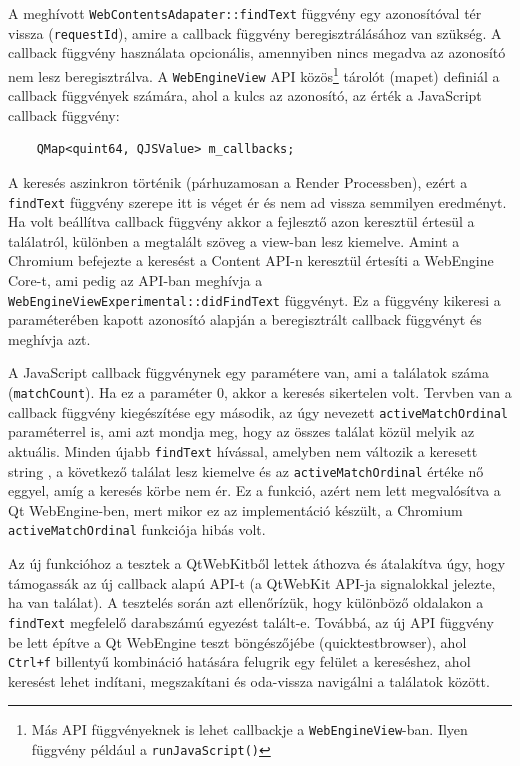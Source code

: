 \documentclass[12pt]{report}
\begin{document}
A meghívott \texttt{WebContentsAdapater::findText} függvény egy azonosítóval tér vissza
(\texttt{requestId}), amire a callback függvény beregisztrálásához van szükség.
A callback függvény használata opcionális, amennyiben nincs megadva az azonosító nem lesz
beregisztrálva. A \texttt{WebEngineView} API közös\footnote{Más API függvényeknek is lehet
callbackje a \texttt{WebEngineView}-ban. Ilyen függvény például a \texttt{runJavaScript()}}
tárolót (mapet) definiál a callback függvények számára, ahol a kulcs az azonosító, az érték
a JavaScript callback függvény:
\begin{verbatim}
    QMap<quint64, QJSValue> m_callbacks;
\end{verbatim}
A keresés aszinkron történik (párhuzamosan a Render Processben), ezért a \texttt{findText}
függvény szerepe itt is véget ér és nem ad vissza semmilyen eredményt. Ha volt
beállítva callback függvény akkor a fejlesztő azon keresztül értesül a találatról, különben
a megtalált szöveg a view-ban lesz kiemelve. Amint a Chromium befejezte a keresést a
Content API-n keresztül értesíti a WebEngine Core-t, ami pedig az API-ban meghívja a
\texttt{WebEngineViewExperimental::didFindText} függvényt. Ez a függvény kikeresi a
paraméterében kapott azonosító alapján a beregisztrált callback függvényt és meghívja azt.

A JavaScript callback függvénynek egy paramétere van, ami a találatok
száma (\texttt{matchCount}). Ha ez a paraméter 0, akkor a keresés sikertelen volt.
Tervben van a callback függvény kiegészítése egy második, az úgy nevezett
\texttt{activeMatchOrdinal} paraméterrel is, ami azt mondja meg, hogy az összes találat
közül melyik az aktuális. Minden újabb \texttt{findText} hívással, amelyben nem
változik a keresett string , a következő találat lesz kiemelve és az
\texttt{activeMatchOrdinal} értéke nő eggyel, amíg a keresés körbe nem ér.
Ez a funkció, azért nem lett megvalósítva a Qt WebEngine-ben, mert mikor
ez az implementáció készült, a Chromium \texttt{activeMatchOrdinal} funkciója hibás volt.

Az új funkcióhoz a tesztek a QtWebKitből lettek áthozva és átalakítva úgy, hogy
támogassák az új callback alapú API-t (a QtWebKit API-ja signalokkal jelezte, ha van
találat). A tesztelés során azt ellenőrízük, hogy különböző oldalakon a \texttt{findText}
megfelelő darabszámú egyezést talált-e. Továbbá, az új API függvény be lett építve a
Qt WebEngine teszt böngészőjébe (quicktestbrowser), ahol \texttt{Ctrl+f} billentyű kombináció
hatására felugrik egy felület a kereséshez, ahol keresést lehet indítani, megszakítani és
oda-vissza navigálni a találatok között.
\end{document}
